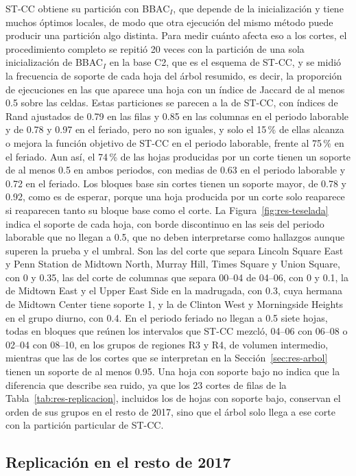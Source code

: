 ST-CC obtiene su partición con BBAC$_I$, que depende de la inicialización y tiene
muchos óptimos locales, de modo que otra ejecución del mismo método puede producir
una partición algo distinta. Para medir cuánto afecta eso a los cortes, el
procedimiento completo se repitió 20 veces con la partición de una sola
inicialización de BBAC$_I$ en la base C2, que es el esquema de ST-CC, y se midió
la frecuencia de soporte de cada hoja del árbol resumido, es decir, la proporción
de ejecuciones en las que aparece una hoja con un índice de Jaccard de al menos
0.5 sobre las celdas. Estas particiones se parecen a la de ST-CC, con índices de
Rand ajustados de 0.79 en las filas y 0.85 en las columnas en el periodo
laborable y de 0.78 y 0.97 en el feriado, pero no son iguales, y solo el 15\,\% de
ellas alcanza o mejora la función objetivo de ST-CC en el periodo laborable, frente
al 75\,\% en el feriado. Aun así, el 74\,\% de las hojas producidas por un corte
tienen un soporte de al menos 0.5 en ambos periodos, con medias de 0.63 en el
periodo laborable y 0.72 en el feriado. Los bloques base sin cortes tienen un
soporte mayor, de 0.78 y 0.92, como es de esperar, porque una hoja producida por un
corte solo reaparece si reaparecen tanto su bloque base como el corte. La
Figura~\ref{fig:res-teselada} indica el soporte de cada hoja, con borde discontinuo
en las seis del periodo laborable que no llegan a 0.5, que no deben interpretarse
como hallazgos aunque superen la prueba y el umbral. Son las del corte que separa
Lincoln Square East y Penn Station de Midtown North, Murray Hill, Times Square y
Union Square, con 0 y 0.35, las del corte de columnas que separa 00--04 de
04--06, con 0 y 0.1, la de Midtown East y el Upper East Side en la madrugada, con
0.3, cuya hermana de Midtown Center tiene soporte 1, y la de Clinton West y
Morningside Heights en el grupo diurno, con 0.4. En el periodo feriado no llegan a
0.5 siete hojas, todas en bloques que reúnen los intervalos que ST-CC mezcló,
04--06 con 06--08 o 02--04 con 08--10, en los grupos de regiones R3 y R4, de
volumen intermedio, mientras que las de los cortes que se interpretan en la
Sección~\ref{sec:res-arbol} tienen un soporte de al menos 0.95. Una hoja con soporte
bajo no indica que la diferencia que describe sea ruido, ya que los 23 cortes de
filas de la Tabla~\ref{tab:res-replicacion}, incluidos los de hojas con soporte
bajo, conservan el orden de sus grupos en el resto de 2017, sino que el árbol solo
llega a ese corte con la partición particular de ST-CC.

\subsection{Replicación en el resto de 2017}

